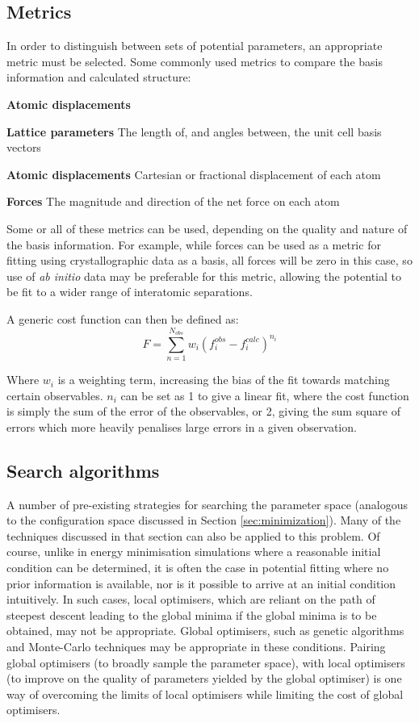 \subsection{Metrics}
In order to distinguish between sets of potential parameters, an appropriate metric must be selected.
Some commonly used metrics to compare the basis information and calculated structure:
\begin{labeling}{\textbf{Atomic displacements}}
	\item [\textbf{Lattice parameters}] The length of, and angles between, the unit cell basis vectors
	\item [\textbf{Atomic displacements}] Cartesian or fractional displacement of each atom
	\item [\textbf{Forces}] The magnitude and direction of the net force on each atom
\end{labeling}
Some or all of these metrics can be used, depending on the quality and nature of the basis information.
For example, while forces can be used as a metric for fitting using crystallographic data as a basis, all forces will be zero in this case, so use of \textit{ab initio} data may be preferable for this metric, allowing the potential to be fit to a wider range of interatomic separations.

A generic cost function can then be defined as:
\begin{equation}
	F = \sum_{n=1}^{N_{obs}}w_i(f_i^{obs} - f_i^{calc})^{n_i}
\end{equation}

Where $w_i$ is a weighting term, increasing the bias of the fit towards matching certain observables.
$n_i$ can be set as 1 to give a linear fit, where the cost function is simply the sum of the error of the observables, or 2, giving the sum square of errors which more heavily penalises large errors in a given observation.

\subsection{Search algorithms}
A number of pre-existing strategies for searching the parameter space (analogous to the configuration space discussed in Section \ref{sec:minimization}).
Many of the techniques discussed in that section can also be applied to this problem.
Of course, unlike in energy minimisation simulations where a reasonable initial condition can be determined, it is often the case in potential fitting where no prior information is available, nor is it possible to arrive at an initial condition intuitively.
In such cases, local optimisers, which are reliant on the path of steepest descent leading to the global minima if the global minima is to be obtained, may not be appropriate.
Global optimisers, such as genetic algorithms and Monte-Carlo techniques may be appropriate in these conditions.
Pairing global optimisers (to broadly sample the parameter space), with local optimisers (to improve on the quality of parameters yielded by the global optimiser) is one way of overcoming the limits of local optimisers while limiting the cost of global optimisers.

